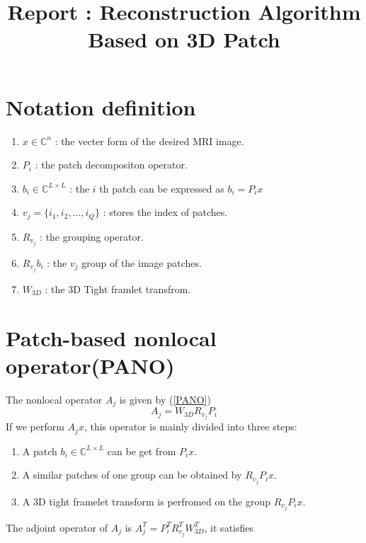 \documentclass[UTF8]{article}
\begin{document}
\title{Report : Reconstruction Algorithm Based on 3D Patch}
\maketitle

\section{Notation definition}
\begin{enumerate}
\item  $x\in \mathbb{C}^n$ : the vecter form of the desired MRI image.
\item  $P_i$ : the patch decompositon operator.
\item  $b_i \in \mathbb{C}^{L\times L}$ : the $i$ th patch can be expressed as  $b_i=P_i x$
\item  $v_j=\{i_1, i_2, \dots ,i_Q\}$ : stores the index of patches.
\item  $R_{v_j}$ : the grouping operator.
\item  $R_{v_j}b_i$ : the $v_j$ group of the image patches.
\item  $W_{3D}$ : the 3D Tight framlet transfrom.
\end{enumerate}


\section{Patch-based nonlocal operator(PANO)}
\par The nonlocal operator  $A_j$ is given by (\ref{PANO})
\begin{equation}\label{PANO}
	A_j=W_{3D}R_{v_j}P_i
\end{equation}
If we perform $A_jx$, this operator is mainly divided into three steps:

\begin{enumerate}
	\item A patch $b_i \in \mathbb{C}^{L \times L}$ can be get from $P_i x$.
	\item A similar patches of one group can be obtained by $R_{v_j}P_i x$.
	\item A 3D tight framelet transform is perfromed on the group $R_{v_j}P_i x$.
\end{enumerate} 
The adjoint operator of $A_j$ is $A_j^T=P_i^TR_{v_j}^TW_{3D}^T$, it satisfies
\end{document}

